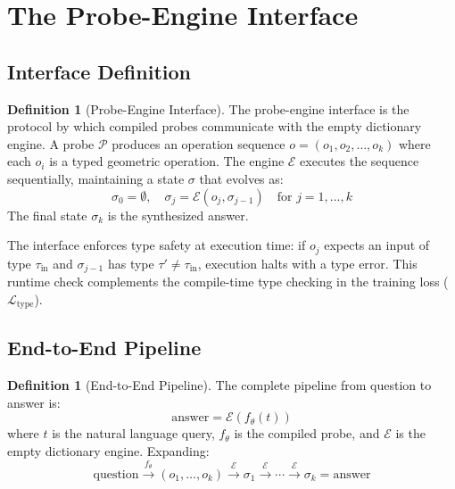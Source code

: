 \documentclass[11pt,twocolumn,a4paper]{article}
\theoremstyle{definition}
\newtheorem{definition}[theorem]{Definition}
\theoremstyle{remark}
\newcommand{\loss}{\mathcal{L}}
\newcommand{\params}{\theta}
\newcommand{\probe}{\mathcal{P}}
\newcommand{\engine}{\mathcal{E}}
\begin{document}
\section{The Probe-Engine Interface}
\label{sec:probe_engine_interface}

\subsection{Interface Definition}

\begin{definition}[Probe-Engine Interface]
\label{def:interface}
The probe-engine interface is the protocol by which compiled probes communicate with the empty dictionary engine. A probe $\probe$ produces an operation sequence $o = (o_1, o_2, \ldots, o_k)$ where each $o_i$ is a typed geometric operation. The engine $\engine$ executes the sequence sequentially, maintaining a state $\sigma$ that evolves as:
\begin{equation}
\sigma_0 = \emptyset, \quad \sigma_j = \engine(o_j, \sigma_{j-1}) \quad \text{for } j = 1, \ldots, k
\end{equation}
The final state $\sigma_k$ is the synthesized answer.
\end{definition}

The interface enforces type safety at execution time: if $o_j$ expects an input of type $\tau_{\text{in}}$ and $\sigma_{j-1}$ has type $\tau' \neq \tau_{\text{in}}$, execution halts with a type error. This runtime check complements the compile-time type checking in the training loss ($\loss_{\mathrm{type}}$).

\subsection{End-to-End Pipeline}

\begin{definition}[End-to-End Pipeline]
\label{def:pipeline}
The complete pipeline from question to answer is:
\begin{equation}
\text{answer} = \engine(f_\params(t))
\end{equation}
where $t$ is the natural language query, $f_\params$ is the compiled probe, and $\engine$ is the empty dictionary engine. Expanding:
\begin{equation}
\text{question} \xrightarrow{f_\params} (o_1, \ldots, o_k) \xrightarrow{\engine} \sigma_1 \xrightarrow{\engine} \cdots \xrightarrow{\engine} \sigma_k = \text{answer}
\end{equation}
\end{definition}
\end{document}
